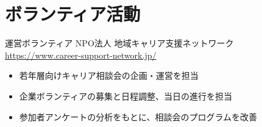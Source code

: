 \documentclass[a4paper, serif, 10pt]{moderncv}
\begin{document}
\section{ボランティア活動}

        {運営ボランティア}
        {NPO法人 地域キャリア支援ネットワーク}
        {\url{https://www.career-support-network.jp/}}
        {}
        {\begin{itemize}
\item 若年層向けキャリア相談会の企画・運営を担当
\item 企業ボランティアの募集と日程調整、当日の進行を担当
\item 参加者アンケートの分析をもとに、相談会のプログラムを改善
\end{itemize}}
    
\end{document}

